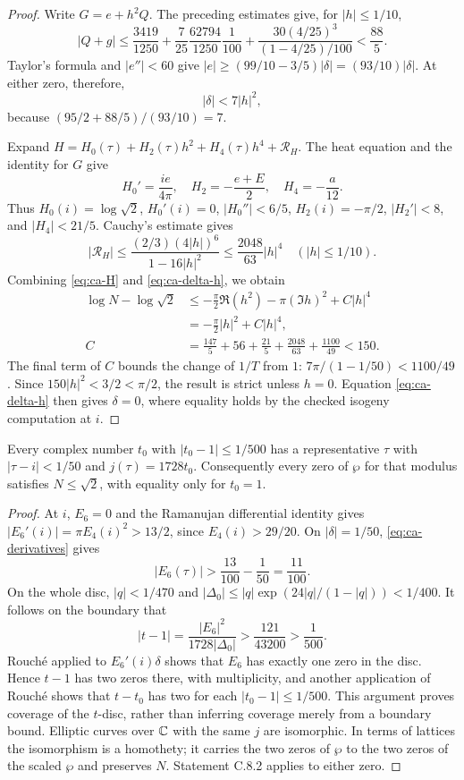 \begin{proof}
Write $G=e+h^2Q$. The preceding estimates give, for $|h|\le1/10$,
\[
 |Q+g|\le
 \frac{3419}{1250}+\frac7{25}\frac{62794}{1250}\frac1{100}
       +\frac{30(4/25)^3}{(1-4/25)/100}<\frac{88}{5}.
\]
Taylor's formula and $|e''|<60$ give
$|e|\ge(99/10-3/5)|\delta|=(93/10)|\delta|$.
At either zero, therefore,
\begin{equation}\label{eq:ca-delta-h}
 |\delta|<7|h|^2,
\end{equation}
because $(95/2+88/5)/(93/10)=7$.

Expand
$H=H_0(\tau)+H_2(\tau)h^2+H_4(\tau)h^4+\mathcal R_H$.
The heat equation and the identity for $G$ give
\[
 H_0'=\frac{ie}{4\pi},\quad
 H_2=-\frac{e+E}{2},\quad H_4=-\frac a{12}.
\]
Thus $H_0(i)=\log\sqrt2$, $H_0'(i)=0$,
$|H_0''|<6/5$, $H_2(i)=-\pi/2$, $|H_2'|<8$, and
$|H_4|<21/5$. Cauchy's estimate gives
\[
 |\mathcal R_H|\le
 \frac{(2/3)(4|h|)^6}{1-16|h|^2}
 \le\frac{2048}{63}|h|^4
 \quad (|h|\le1/10).
\]
Combining \eqref{eq:ca-H} and \eqref{eq:ca-delta-h}, we obtain
\begin{align*}
 \log N-\log\sqrt2
 &\le-\frac\pi2\Re(h^2)-\pi(\Im h)^2+C|h|^4\\
 &=-\frac\pi2|h|^2+C|h|^4,\\
 C&=\frac{147}{5}+56+\frac{21}{5}
                 +\frac{2048}{63}+\frac{1100}{49}<150.
\end{align*}
The final term of $C$ bounds the change of $1/T$ from $1$:
$7\pi/(1-1/50)<1100/49$. Since $150|h|^2<3/2<\pi/2$,
the result is strict unless $h=0$. Equation
\eqref{eq:ca-delta-h} then gives $\delta=0$, where equality
holds by the checked isogeny computation at $i$.
\end{proof}

\begin{statement}
Every complex number $t_0$ with $|t_0-1|\le1/500$ has a
representative $\tau$ with $|\tau-i|<1/50$ and $j(\tau)=1728t_0$.
Consequently every zero of $\wp$ for that modulus satisfies
$N\le\sqrt2$, with equality only for $t_0=1$.
\end{statement}
\begin{proof}
At $i$, $E_6=0$ and the Ramanujan differential identity gives
$|E_6'(i)|=\pi E_4(i)^2>13/2$, since $E_4(i)>29/20$.
On $|\delta|=1/50$, \eqref{eq:ca-derivatives} gives
\[
 |E_6(\tau)|>\frac{13}{100}-\frac1{50}=\frac{11}{100}.
\]
On the whole disc, $|q|<1/470$ and
$|\Delta_0|\le |q|\exp(24|q|/(1-|q|))<1/400$.
It follows on the boundary that
\[
 |t-1|=\frac{|E_6|^2}{1728|\Delta_0|}
 >\frac{121}{43200}>\frac1{500}.
\]
Rouch\'e applied to $E_6'(i)\delta$ shows that $E_6$ has
exactly one zero in the disc. Hence $t-1$ has two zeros there,
with multiplicity, and another application of Rouch\'e shows
that $t-t_0$ has two for each $|t_0-1|\le1/500$.
This argument proves coverage of the $t$-disc, rather than
inferring coverage merely from a boundary bound. Elliptic
curves over $\mathbb C$ with the same $j$ are isomorphic. In terms of
lattices the isomorphism is a homothety; it carries the two
zeros of $\wp$ to the two zeros of the scaled $\wp$ and
preserves $N$. Statement C.8.2 applies to either zero.
\end{proof}

